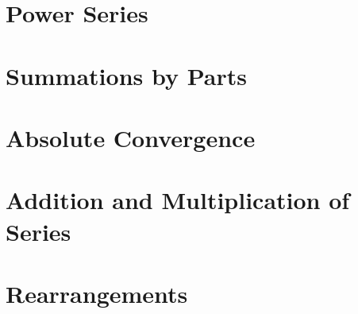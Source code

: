 \section{Power Series}\label{sec:power-series}


\section{Summations by Parts}\label{sec:summations-by-parts}


\section{Absolute Convergence}\label{sec:absolute-convergence}


\section{Addition and Multiplication of Series}\label{sec:addition-and-multiplication-of-series}


\section{Rearrangements}\label{sec:rearrangements}

